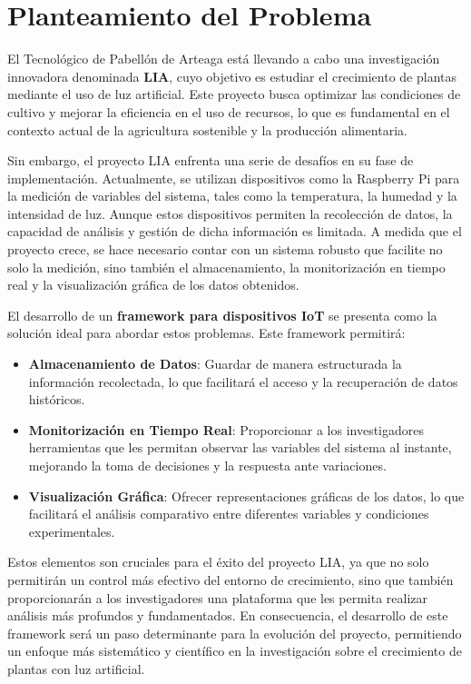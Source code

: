 
\section{Planteamiento del Problema}

El Tecnológico de Pabellón de Arteaga está llevando a cabo una investigación innovadora denominada \textbf{LIA}, cuyo objetivo es estudiar el crecimiento de plantas mediante el uso de luz artificial. Este proyecto busca optimizar las condiciones de cultivo y mejorar la eficiencia en el uso de recursos, lo que es fundamental en el contexto actual de la agricultura sostenible y la producción alimentaria.

Sin embargo, el proyecto LIA enfrenta una serie de desafíos en su fase de implementación. Actualmente, se utilizan dispositivos como la Raspberry Pi para la medición de variables del sistema, tales como la temperatura, la humedad y la intensidad de luz. Aunque estos dispositivos permiten la recolección de datos, la capacidad de análisis y gestión de dicha información es limitada. A medida que el proyecto crece, se hace necesario contar con un sistema robusto que facilite no solo la medición, sino también el almacenamiento, la monitorización en tiempo real y la visualización gráfica de los datos obtenidos.

El desarrollo de un \textbf{framework para dispositivos IoT} se presenta como la solución ideal para abordar estos problemas. Este framework permitirá:

\begin{itemize}
    \item \textbf{Almacenamiento de Datos}: Guardar de manera estructurada la información recolectada, lo que facilitará el acceso y la recuperación de datos históricos.
    \item \textbf{Monitorización en Tiempo Real}: Proporcionar a los investigadores herramientas que les permitan observar las variables del sistema al instante, mejorando la toma de decisiones y la respuesta ante variaciones.
    \item \textbf{Visualización Gráfica}: Ofrecer representaciones gráficas de los datos, lo que facilitará el análisis comparativo entre diferentes variables y condiciones experimentales.
\end{itemize}

Estos elementos son cruciales para el éxito del proyecto LIA, ya que no solo permitirán un control más efectivo del entorno de crecimiento, sino que también proporcionarán a los investigadores una plataforma que les permita realizar análisis más profundos y fundamentados. En consecuencia, el desarrollo de este framework será un paso determinante para la evolución del proyecto, permitiendo un enfoque más sistemático y científico en la investigación sobre el crecimiento de plantas con luz artificial.
